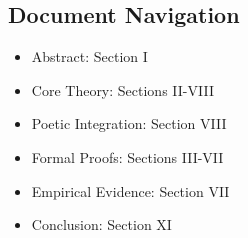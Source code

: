 \subsection{Document Navigation}
\begin{itemize}
    \item Abstract: Section I
    \item Core Theory: Sections II-VIII
    \item Poetic Integration: Section VIII
    \item Formal Proofs: Sections III-VII
    \item Empirical Evidence: Section VII
    \item Conclusion: Section XI
\end{itemize}




